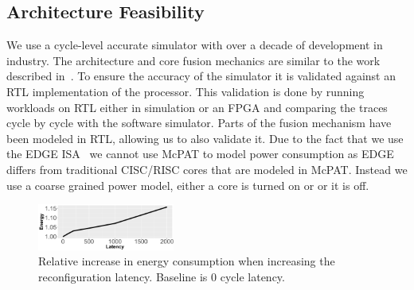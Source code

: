 \subsection{Architecture Feasibility}
We use a cycle-level accurate simulator with over a decade of development in industry.
The architecture and core fusion mechanics are similar to the work described in~\cite{kim2007tflex,putnam2010e2}.
To ensure the accuracy of the simulator it is validated against an RTL implementation of the processor.
This validation is done by running workloads on RTL either in simulation or an FPGA and comparing the traces cycle by cycle with the software simulator.
Parts of the fusion mechanism have been modeled in RTL, allowing us to also validate it.
Due to the fact that we use the EDGE ISA~\cite{smith2006edge} we cannot use McPAT to model power consumption as EDGE differs from traditional CISC/RISC cores that are modeled in McPAT.
Instead we use a coarse grained power model, either a core is turned on or or it is off. 


\begin{figure}[t]
    \centering
	\includegraphics[width=0.4\textwidth]{graphics/Exploration/lat_en_2000.pdf}
\vspace*{-5mm}
    \caption{Relative increase in energy consumption when increasing the reconfiguration latency. Baseline is 0 cycle latency.}
    \label{fig:enlatency}
\end{figure}
